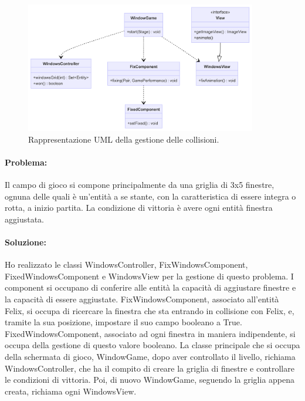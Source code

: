 \documentclass[a4paper,12pt]{report}
\begin{document}
\begin{figure}[H]
\centering{}
\includegraphics[width=0.9\textwidth]{img/windows.png}
\caption{Rappresentazione UML della gestione delle collisioni.}
\end{figure}

\paragraph{Problema:}
Il campo di gioco si compone principalmente da una griglia di 3x5 finestre, ognuna delle quali è un'entità a se stante, con la caratteristica di essere integra o rotta, a inizio partita.
La condizione di vittoria è avere ogni entità finestra aggiustata.

\paragraph{Soluzione:}

Ho realizzato le classi WindowsController, FixWindowsComponent, FixedWindowsComponent e WindowsView per la gestione di questo problema. 
I component  si occupano di conferire alle entità la capacità di aggiustare finestre e la capacità di essere aggiustate.
FixWindowsComponent, associato all'entità Felix, si occupa di ricercare la finestra che sta entrando in collisione con Felix, e, tramite la sua posizione, impostare il suo campo booleano a True.
FixedWindowsComponent, associato ad ogni finestra in maniera indipendente, si occupa della gestione di questo valore booleano.
La classe principale che si occupa della schermata di gioco, WindowGame, dopo aver controllato il livello, richiama WindowsController, che ha il compito di creare la griglia di finestre e controllare le condizioni di vittoria.
Poi, di nuovo WindowGame, seguendo la griglia appena creata, richiama ogni WindowsView.
\end{document}
